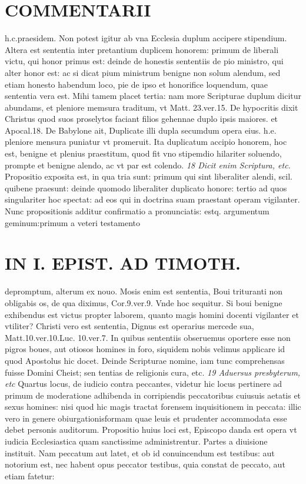 \documentclass{article}
\begin{document}
\begin{pages}
\section*{COMMENTARII }
\marginpar{[ p.132 ]}\pstart h.c.praesidem. Non potest igitur ab vna Ecclesia duplum accipere stipendium. Altera est sententia inter pretantium duplicem honorem: primum de liberali victu, qui honor primus est: deinde de honestis sententiis de pio ministro, qui alter honor est: ac si dicat pium ministrum benigne non solum alendum, sed etiam honesto habendum loco, pie de ipso et honorifice loquendum, quae sententia vera est. Mihi tamem placet tertia: nam more Scripturae duplum dicitur abundams, et pleniore memsura traditum, vt Matt. 23.ver.15. De hypocritis dixit Christus quod suos proselytos faciant filios gehennae duplo ipsis maiores. et Apocal.18. De Babylone ait, Duplicate illi dupla secumdum opera eius. h.e. pleniore mensura puniatur vt promeruit. Ita duplicatum accipio honorem, hoc est, benigne et plenius praestitum, quod fit vno stipemdio hilariter soluendo, prompte et benigne alendo, ac vt par est colendo.  \pend
\textit{18 Dicit enim Scriptura, etc. }\pstart Propositio exposita est, in qua tria sunt: primum qui sint liberaliter alendi, scil. quibene praesunt: deinde quomodo liberaliter duplicato honore: tertio ad quos singulariter hoc spectat: ad eos qui in doctrina suam praestant operam vigilanter. Nunc propositionis additur confirmatio a pronunciatis: estq. argumentum geminum:primum a veteri testamento  \pend
\section*{IN I. EPIST. AD TIMOTH. }
\marginpar{[ p.133 ]}\pstart depromptum, alterum ex nouo. Mosis enim est sententia, Boui trituranti non obligabis os, de qua diximus, Cor.9.ver.9. Vnde hoc sequitur. Si boui benigne exhibendus est victus propter laborem, quanto magis homini docenti vigilanter et vtiliter? Christi vero est sententia, Dignus est operarius mercede sua, Matt.10.ver.10.Luc. 10.ver.7. In quibus  sententiis obseruemus oportere esse non pigros boues, aut otiosos homines in foro, siquidem nobis velimus applicare id quod Apostolus hic docet. Deinde Scripturae nomine, iam tunc comprehensas fuisse Domini Cheist; sen tentias de religionis cura, etc.  \pend
\textit{19 Aduersus presbyterum, etc }\pstart Quartus locus, de iudicio contra peccantes, videtur hic locus pertinere ad primum de moderatione adhibenda in corripiendis peccatoribus  cuiusuis aetatis et sexus homines: nisi quod hic magis tractat forensem inquisitionem in peccata: illic vero in genere obiurgationisformam quae leuis et prudenter accommodata esse debet personis auditorum.  \pend\pstart Propositio huius loci est, Episcopo danda est opera vt iudicia Ecclesiastica quam sanctissime administrentur.  \pend\pstart Partes a diuisione instituit. Nam peccatum aut latet, et ob id conuincendum est testibus: aut notorium est, nec habent opus peccator testibus, quia constat de peccato, aut etiam fatetur:  \pend

\end{pages}
\end{document}
